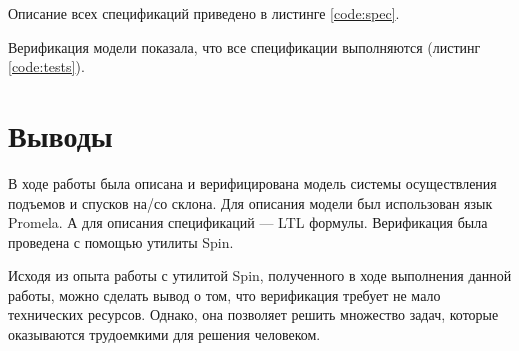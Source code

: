 
\parindent=1cm


Описание всех спецификаций приведено в листинге \ref{code:spec}.



\parindent=1cm

Верификация модели показала, что все спецификации выполняются (листинг \ref{code:tests}).



\parindent=1cm

\newpage
\section{Выводы}
В ходе работы была описана и верифицирована модель системы осуществления подъемов и спусков на/со склона. Для описания модели был использован язык Promela. А для описания спецификаций --- LTL формулы. Верификация была проведена с помощью утилиты Spin. 

Исходя из опыта работы с утилитой Spin, полученного в ходе выполнения данной работы, можно сделать вывод о том, что верификация требует не мало технических ресурсов. Однако, она позволяет решить множество задач, которые оказываются трудоемкими для решения человеком.


